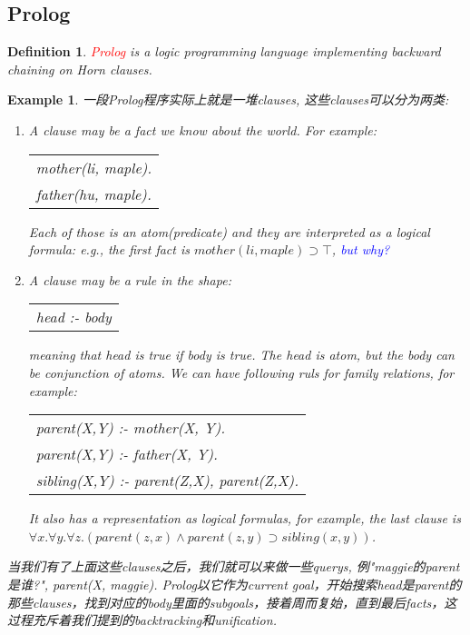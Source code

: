 \documentclass{article}
\theoremstyle{plain}
\newtheorem{example}[theorem]{Example}
\newtheorem{definition}[theorem]{Definition}
\theoremstyle{nonumberplain}
\newcommand{\redt}[1]{\textcolor{red}{#1}}
\newcommand{\bluet}[1]{\textcolor{blue}{#1}}
\begin{document}
\newpage
\subsection{Prolog}

\begin{definition}
\rm \redt{Prolog} is a logic programming language implementing backward chaining on Horn clauses.
\end{definition}

\begin{example}
\rm 一段Prolog程序实际上就是一堆clauses, 这些clauses可以分为两类:
\begin{enumerate}
	\item A clause may be a fact we know about the world. For example: \newline\newline
	\begin{tabular}{l}
	mother(li, maple). \\
	father(hu, maple).
	\end{tabular}\newline\newline
	Each of those is an atom(predicate) and they are interpreted as a logical formula: e.g., the first fact is $mother(li, maple) \supset \top$, \bluet{but why?}
	\item A clause may be a rule in the shape:\newline\newline
	\begin{tabular}{l}
	head :- body
	\end{tabular}\newline\newline
	meaning that head is true if body is true. The head is atom, but the body can be conjunction of atoms. We can have following ruls for family relations, for example:\newline\newline
	\begin{tabular}{l}
	parent(X,Y) :- mother(X, Y). \\
	parent(X,Y) :- father(X, Y). \\
	sibling(X,Y) :- parent(Z,X), parent(Z,X). \\
	\end{tabular}\newline\newline
	It also has a representation as logical formulas, for example, the last clause is \newline $\forall x.\forall y.\forall z. (parent(z,x) \wedge parent(z,y) \supset sibling(x,y))$.
\end{enumerate}
当我们有了上面这些clauses之后，我们就可以来做一些querys, 例"maggie的parent是谁?", parent(X, maggie). Prolog以它作为current goal，开始搜索head是parent的那些clauses，找到对应的body里面的subgoals，接着周而复始，直到最后facts，这过程充斥着我们提到的backtracking和unification. 
\end{example}
\end{document}

